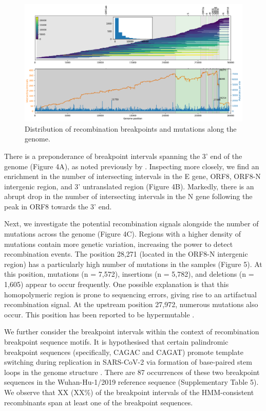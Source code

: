 \documentclass{article}
\begin{document}
\begin{figure}
\centering
\includegraphics[width=\textwidth]{figures/recombination_intervals.pdf}
\caption{\label{fig:breakpoint-distribution}
Distribution of recombination breakpoints and mutations along the genome.}
\end{figure}

There is a preponderance of breakpoint intervals spanning the 3’ end of the
genome (Figure 4A), as noted previously by \cite{Turakhia2022-it}. Inspecting
more closely, we find an enrichment in the number of intersecting intervals in
the E gene, ORF8, ORF8-N intergenic region, and 3’ untranslated region (Figure
4B). Markedly, there is an abrupt drop in the number of intersecting intervals
in the N gene following the peak in ORF8 towards the 3’ end.

Next, we investigate the potential recombination signals alongside the number
of mutations across the genome (Figure 4C). Regions with a higher density of
mutations contain more genetic variation, increasing the power to detect
recombination events. The position 28,271 (located in the ORF8-N intergenic
region) has a particularly high number of mutations in the samples (Figure 5).
At this position, mutations (n = 7,572), insertions (n = 5,782), and deletions
(n = 1,605) appear to occur frequently. One possible explanation is that this
homopolymeric region is prone to sequencing errors, giving rise to an
artifactual recombination signal. At the upstream position 27,972, numerous
mutations also occur. This position has been reported to be hypermutable
\citep{Jungreis2021-dh}.

We further consider the breakpoint intervals within the context of
recombination breakpoint sequence motifs. It is hypothesised that certain
palindromic breakpoint sequences (specifically, CAGAC and CAGAT) promote
template switching during replication in SARS-CoV-2 via formation of
base-paired stem loops in the genome structure \citep{Gallaher2020-lb}. There
are 87 occurrences of these two breakpoint sequences in the Wuhan-Hu-1/2019
reference sequence (Supplementary Table 5). We observe that XX (XX\%) of the
breakpoint intervals of the HMM-consistent recombinants span at least one of
the breakpoint sequences.
\end{document}

